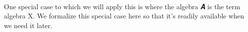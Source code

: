 \begin{code}
\AgdaSpace{}%
\AgdaSpace{}%
\AgdaSpace{}%
\AgdaSpace{}%
\AgdaSpace{}%
\AgdaSpace{}%
\AgdaSymbol{)}\<%
\\
\>[182I][@{}l@{\AgdaIndent{0}}]%
\>[46]\AgdaSpace{}%
\AgdaSpace{}%
\AgdaSpace{}%
\AgdaSpace{}%
\AgdaSpace{}%
\AgdaSpace{}%
\AgdaSpace{}%
\AgdaSpace{}%
\AgdaSpace{}%
\<%
\\
%
\>[1]\AgdaSpace{}%
\AgdaSymbol{=}\AgdaSpace{}%
\AgdaSpace{}%
\AgdaSpace{}%
\AgdaSpace{}%
\AgdaSpace{}%
\AgdaSpace{}%
\AgdaSpace{}%
\AgdaSpace{}%
\AgdaSpace{}%
\<%
\\
%
\\[\AgdaEmptyExtraSkip]%
%
\>[1]\AgdaSpace{}%
\AgdaSymbol{:}\AgdaSpace{}%
\AgdaSpace{}%
\AgdaSymbol{(}\AgdaSpace{}%
\AgdaOperator{\AgdaFunction{[}}\AgdaSpace{}%
\AgdaSpace{}%
\AgdaOperator{\AgdaFunction{]/ker}}\AgdaSpace{}%
\AgdaSymbol{)}\AgdaSpace{}%
\<%
\\
%
\>[1]\AgdaSpace{}%
\AgdaSymbol{=}\AgdaSpace{}%
\AgdaSpace{}%
\AgdaSpace{}%
\<%
\\
%
\\[\AgdaEmptyExtraSkip]%
%
\>[1]\AgdaSpace{}%
\AgdaSymbol{:}\AgdaSpace{}%
\AgdaSpace{}%
\AgdaSpace{}%
\AgdaSpace{}%
\<%
\\
%
\>[1]\AgdaSpace{}%
\AgdaSymbol{=}\AgdaSpace{}%
\AgdaSpace{}%
\AgdaSymbol{(}\AgdaSpace{}%
\AgdaSymbol{(}\AgdaSpace{}%
\AgdaSymbol{))}\<%
\end{code}
\ccpad
One special case to which we will apply this is where the algebra \ab 𝑨 is the term algebra  \ab X. We formalize this special case here so that it's readily available when we need it later.
